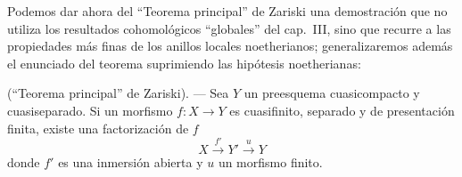 \begin{env}[8.12.5]
\label{IV.8.12.5-fr}
Podemos dar ahora del ``Teorema principal'' de Zariski  una demostración que no utiliza los resultados cohomológicos ``globales'' del cap.~III, sino que recurre a las propiedades más finas de los anillos locales noetherianos; generalizaremos además el enunciado del teorema suprimiendo las hipótesis noetherianas:
\end{env}

\begin{theorem}[8.12.6]
\label{IV.8.12.6-fr}
(``Teorema principal'' de Zariski). --- Sea $Y$ un preesquema cuasicompacto y cuasiseparado.
Si un morfismo $f:X\to Y$ es cuasifinito, separado y de presentación finita, existe una factorización de $f$
\begin{equation}
\label{IV.8.12.6.1-fr}
X\xrightarrow{f'}Y'\xrightarrow{u}Y \tag{8.12.6.1}
\end{equation}
donde $f'$ es una inmersión abierta y $u$ un morfismo finito.
\end{theorem}


